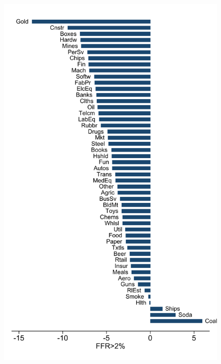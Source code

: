 \documentclass[12pt]{article}
\begin{document}
\newpage
\begin{figure}[h]
	\begin{centering}
		\includegraphics[scale=0.5]{../output/Figures/industry_fomc_bar_gt2}

\end{centering}
\end{figure}
\end{document}
